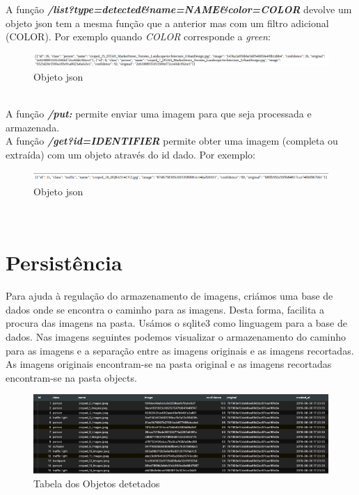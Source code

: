 \documentclass{report}
\begin{document}
A função  \textbf{\textit{/list?type=detected\&name=NAME\&color=COLOR}} devolve um objeto \ac{json} tem a mesma função que a anterior mas com um filtro adicional (COLOR).
Por exemplo quando \textit{COLOR} corresponde a \textit{green}:
\vspace{5 mm}
\begin{figure}[!ht]
    \centering
    \includegraphics[scale = 0.3]{green.png}
    \caption{Objeto \ac{json}}
    \label{fig:object4}
\end{figure}\\

A função \textbf{\textit{/put:}} permite enviar uma imagem para que seja processada e armazenada.\\

A função \textbf{\textit{/get?id=IDENTIFIER}} permite obter uma imagem (completa ou extraída) com um objeto através do id dado.
Por exemplo:
\vspace{5 mm}
\begin{figure}[!ht]
    \centering
    \includegraphics[scale = 0.35]{get.png}
    \caption{Objeto \ac{json}}
    \label{fig:object5}
\end{figure}\\
\chapter{Persistência}
\label{chap.persistencia}
Para ajuda à regulação do armazenamento de imagens, criámos uma base de dados onde se encontra o caminho para as imagens. Desta forma, facilita a procura das imagens na pasta. Usámos o sqlite3 como linguagem para a base de dados. Nas imagens seguintes podemos visualizar o armazenamento do caminho para as imagens e a separação entre as imagens originais e as imagens recortadas. As imagens originais encontram-se na pasta original e as imagens recortadas encontram-se na pasta objects.

\begin{figure}[!ht]
    \centering
    \includegraphics[scale = 0.5]{dbObjects.png}
    \caption{Tabela dos Objetos detetados}
    \label{fig:bdobjs}
\end{figure}
\end{document}

